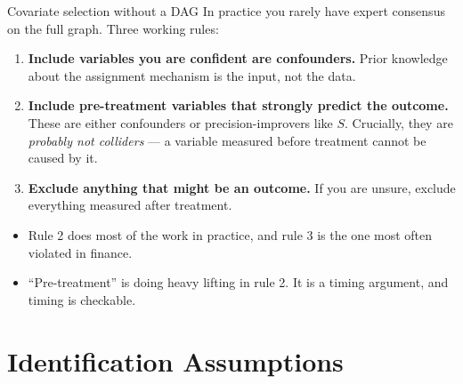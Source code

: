 \documentclass[
  11pt,
  ignorenonframetext,
  aspectratio=169,
]{beamer}
\providecommand{\tightlist}{%
  \setlength{\itemsep}{0pt}\setlength{\parskip}{0pt}}
\begin{document}
\begin{frame}{Covariate selection without a DAG}
\protect{}\label{covariate-selection-without-a-dag}
In practice you rarely have expert consensus on the full graph. Three
working rules:

\begin{enumerate}
\tightlist
\item
  \textbf{Include variables you are confident are confounders.} Prior
  knowledge about the assignment mechanism is the input, not the data.
\item
  \textbf{Include pre-treatment variables that strongly predict the
  outcome.} These are either confounders or precision-improvers like
  \(S\). Crucially, they are \emph{probably not colliders} --- a
  variable measured before treatment cannot be caused by it.
\item
  \textbf{Exclude anything that might be an outcome.} If you are unsure,
  exclude everything measured after treatment.
\end{enumerate}

\vspace{0.3em}

\begin{itemize}
\tightlist
\item
  Rule 2 does most of the work in practice, and rule 3 is the one most
  often violated in finance.
\item
  ``Pre-treatment'' is doing heavy lifting in rule 2. It is a timing
  argument, and timing is checkable.
\end{itemize}
\end{frame}

\section{Identification Assumptions}\label{identification-assumptions}
\end{document}
